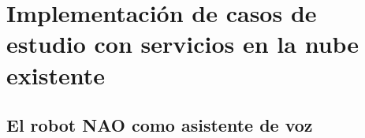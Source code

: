 
\section{Implementación de casos de estudio con servicios en la nube existente}
\label{\detokenize{chapter_two/study_cases_implementation:implementacion-de-casos-de-estudio-con-servicios-en-la-nube-existente}}\label{\detokenize{chapter_two/study_cases_implementation::doc}}


\subsection{El robot NAO como asistente de voz}

